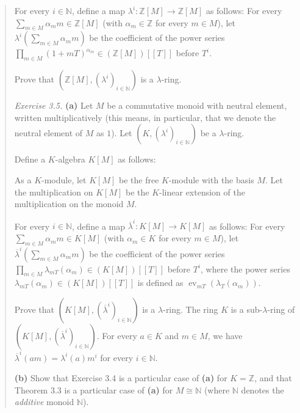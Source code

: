 \documentclass[numbers=enddot,12pt,final,onecolumn,notitlepage]{scrartcl}%
\begin{document}
\begin{quotation}
For every $i\in\mathbb{N}$, define a map $\lambda^{i}:\mathbb{Z}\left[
M\right]  \rightarrow\mathbb{Z}\left[  M\right]  $ as follows: For every
$\sum\limits_{m\in M}\alpha_{m}m\in\mathbb{Z}\left[  M\right]  $ (with
$\alpha_{m}\in\mathbb{Z}$ for every $m\in M$), let $\lambda^{i}\left(
\sum\limits_{m\in M}\alpha_{m}m\right)  $ be the coefficient of the power
series $\prod\limits_{m\in M}\left(  1+mT\right)  ^{\alpha_{m}}\in\left(
\mathbb{Z}\left[  M\right]  \right)  \left[  \left[  T\right]  \right]  $
before $T^{i}$.

Prove that $\left(  \mathbb{Z}\left[  M\right]  ,\left(  \lambda^{i}\right)
_{i\in\mathbb{N}}\right)  $ is a $\lambda$-ring.

\textit{Exercise 3.5.} \textbf{(a)} Let $M$ be a commutative monoid with
neutral element, written multiplicatively (this means, in particular, that we
denote the neutral element of $M$ as $1$). Let $\left(  K,\left(  \lambda
^{i}\right)  _{i\in\mathbb{N}}\right)  $ be a $\lambda$-ring.

Define a $K$-algebra $K\left[  M\right]  $ as follows:

As a $K$-module, let $K\left[  M\right]  $ be the free $K$-module with the
basis $M$. Let the multiplication on $K\left[  M\right]  $ be the $K$-linear
extension of the multiplication on the monoid $M$.

For every $i\in\mathbb{N}$, define a map $\overline{\lambda}^{i}:K\left[
M\right]  \rightarrow K\left[  M\right]  $ as follows: For every
$\sum\limits_{m\in M}\alpha_{m}m\in K\left[  M\right]  $ (with $\alpha_{m}\in
K$ for every $m\in M$), let $\overline{\lambda}^{i}\left(  \sum\limits_{m\in
M}\alpha_{m}m\right)  $ be the coefficient of the power series $\prod
\limits_{m\in M}\lambda_{mT}\left(  \alpha_{m}\right)  \in\left(  K\left[
M\right]  \right)  \left[  \left[  T\right]  \right]  $ before $T^{i}$, where
the power series $\lambda_{mT}\left(  \alpha_{m}\right)  \in\left(  K\left[
M\right]  \right)  \left[  \left[  T\right]  \right]  $ is defined as
$\operatorname*{ev}_{mT}\left(  \lambda_{T}\left(  \alpha_{m}\right)  \right)
$.

Prove that $\left(  K\left[  M\right]  ,\left(  \overline{\lambda}^{i}\right)
_{i\in\mathbb{N}}\right)  $ is a $\lambda$-ring. The ring $K$ is a
sub-$\lambda$-ring of $\left(  K\left[  M\right]  ,\left(  \overline{\lambda
}^{i}\right)  _{i\in\mathbb{N}}\right)  $. For every $a\in K$ and $m\in M$, we
have $\overline{\lambda}^{i}\left(  am\right)  =\lambda^{i}\left(  a\right)
m^{i}$ for every $i\in\mathbb{N}$.

\textbf{(b)} Show that Exercise 3.4 is a particular case of \textbf{(a)} for
$K=\mathbb{Z}$, and that Theorem 3.3 is a particular case of \textbf{(a)} for
$M\cong\mathbb{N}$ (where $\mathbb{N}$ denotes the \textit{additive} monoid
$\mathbb{N}$).
\end{quotation}
\end{document}
